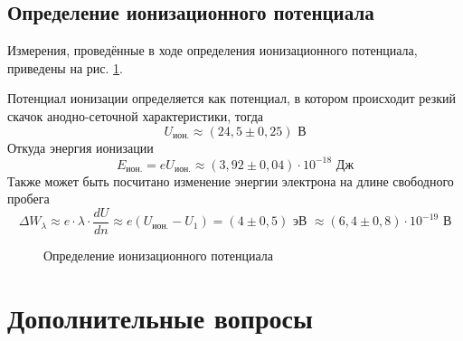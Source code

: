\documentclass[a4paper]{article}
\begin{document}
\subsection*{Определение ионизационного потенциала}

Измерения, проведённые в ходе определения ионизационного потенциала,
приведены на рис. \ref{Определение ионизационного потенциала}.

Потенциал ионизации определяется как потенциал, в котором происходит
резкий скачок анодно-сеточной характеристики, тогда
$$
    U_\text{ион.} \approx (24,5 \pm 0,25) \text{ В}
$$
Откуда энергия ионизации
$$
    E_\text{ион.} = e U_\text{ион.} \approx (3,92 \pm 0,04) \cdot 10^{-18} \text{ Дж}
$$
Также может быть посчитано изменение энергии электрона на длине свободного пробега
$$
    \Delta W_\lambda \approx e \cdot \lambda \cdot \dfrac{dU}{dn} \approx e (U_\text{ион.} - U_1) = (4 \pm 0,5) \text{ эВ } \approx (6,4 \pm 0,8) \cdot 10^{-19} \text{ В}
$$

\begin{figure}[h]
    \centering
    \caption{Определение ионизационного потенциала}
    \label{Определение ионизационного потенциала}
\end{figure}

\section*{\centering Дополнительные вопросы}
\end{document}

